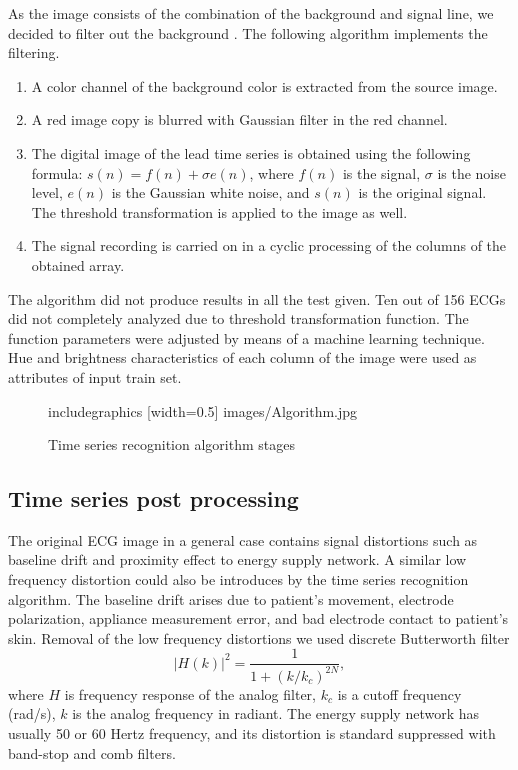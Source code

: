 \documentclass[runningheads]{AIIT}
\newcommand{\nnn}[2][rcolor]{\noindent%
\textcolor{eclr}{}\textcolor{#1}{#2}\textcolor{eclr}{}}
\begin{document}
As the image consists of the combination of the background and signal line, we decided to filter out the background \cite{1}.  The following algorithm implements the filtering.
\begin{enumerate}
\item A color channel of the background color is extracted from the source image.
\item A red image copy is blurred with Gaussian filter in the red channel.
\item The digital image of the lead time series is obtained using the following formula:
  $s(n)=f(n)+\sigma e(n)$, where $f(n)$ is the signal, $\sigma$ is the
  noise level, $e(n)$ is the Gaussian white noise, and $s(n)$ is the original
  signal.  The threshold transformation is applied to the image as well.
\item The signal recording is carried on in a cyclic processing \nnn{of the columns of the obtained array.}
\end{enumerate}
The algorithm did not produce results in all the test given.  Ten out of 156 ECGs did not completely analyzed due to threshold transformation function.  The function parameters were adjusted by means of a machine learning technique.  Hue and brightness characteristics of each column of the image were used as attributes of input train set.


\begin{figure}[htb]
  \centering
    includegraphics [width=0.5\linewidth] {images/Algorithm.jpg}
  \caption{Time series recognition algorithm stages}
  \label{fig:leads-ex}
\end{figure}

\subsection{Time series post processing}
\label{sec:cleaning-artefacts}

The original ECG image in a general case contains signal distortions such as baseline drift and proximity effect to energy supply network.  A similar low frequency distortion could also be introduces by the time series recognition algorithm.  The baseline drift arises due to patient's movement, electrode polarization, appliance measurement error, and bad electrode contact to patient's skin.  Removal of the low frequency distortions we used discrete Butterworth filter
$$
|H(k)|^2=\frac{1}{1+(k/k_c)^{2N}},
$$
where $H$ is frequency response of the analog filter, $k_c$ is a cutoff frequency (rad/s), $k$ is the analog frequency in radiant.  The energy supply network has usually 50 or 60 Hertz frequency, and its distortion is standard suppressed with band-stop and comb filters.
\end{document}
